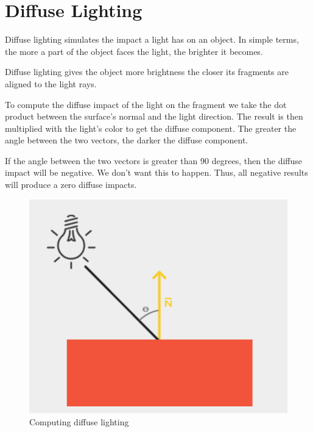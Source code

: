 \section{Diffuse Lighting}

Diffuse lighting simulates the impact a light has on an object.
In simple terms, the more a part of the object faces the light, the brighter
it becomes.

Diffuse lighting gives the object more brightness the closer its fragments
are aligned to the light rays.

To compute the diffuse impact of the light on the fragment we take the dot
product between the surface's normal and the light direction.
The result is then multiplied with the light's color to get the diffuse component.
The greater the angle between the two vectors, the darker the diffuse component.

If the angle between the two vectors is greater than $90$ degrees, then the
diffuse impact will be negative.
We don't want this to happen.
Thus, all negative results will produce a zero diffuse impacts.

\begin{figure}[ht]
    \centering
    \includegraphics[scale=0.40]{images/ChBlinnPhong/DiffuseLighting.png}
    \caption{Computing diffuse lighting}
    \label{fig::ComputingDiffuseLighting}
\end{figure}

\begin{minipage}{\linewidth}{\noindent}
    
\end{minipage}

